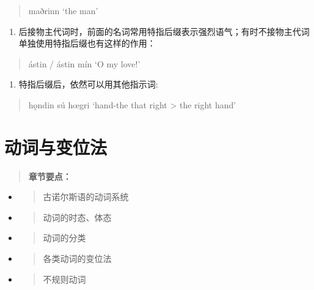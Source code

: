 \begin{quote}
maðrinn `the man'
\end{quote}

\begin{enumerate}
\def\labelenumi{\arabic{enumi})}
\setcounter{enumi}{1}
\item
  后接物主代词时，前面的名词常用特指后缀表示强烈语气；有时不接物主代词单独使用特指后缀也有这样的作用：
\end{enumerate}

\begin{quote}
ástin / ástin mín `O my love!'
\end{quote}

\begin{enumerate}
\def\labelenumi{\arabic{enumi})}
\setcounter{enumi}{2}
\item
  特指后缀后，依然可以用其他指示词:
\end{enumerate}

\begin{quote}
hǫndin sú hœgri `hand-the that right \textgreater{} the right hand'
\end{quote}

\section{动词与变位法}\label{ux52a8ux8bcdux4e0eux53d8ux4f4dux6cd5}

\begin{quote}
\textbf{章节要点：}
\end{quote}

\begin{itemize}
\item
  \begin{quote}
  古诺尔斯语的动词系统
  \end{quote}
\item
  \begin{quote}
  动词的时态、体态
  \end{quote}
\item
  \begin{quote}
  动词的分类
  \end{quote}
\item
  \begin{quote}
  各类动词的变位法
  \end{quote}
\item
  \begin{quote}
  不规则动词
  \end{quote}
\end{itemize}

